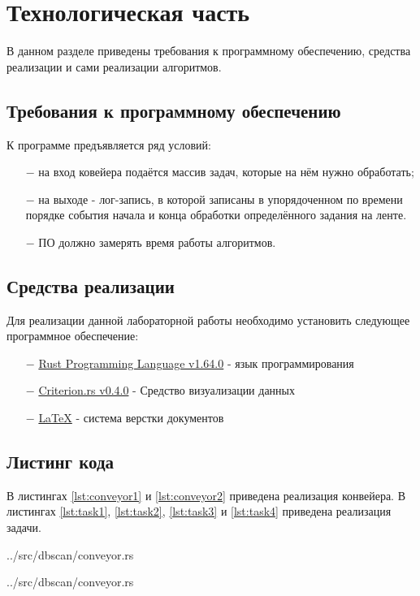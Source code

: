 \chapter{Технологическая часть}

В данном разделе приведены требования к программному обеспечению, средства реализации и сами реализации алгоритмов.

\section{Требования к программному обеспечению}
К программе предъявляется ряд условий:
\begin{itemize}
    \item[$-$] на вход ковейера подаётся массив задач, которые на нём нужно обработать;
	\item[$-$] на выходе - лог-запись, в которой записаны в упорядоченном по времени порядке события начала и конца обработки определённого задания на ленте.
    \item[$-$] ПО должно замерять время работы алгоритмов.
\end{itemize}

\section{Средства реализации}
Для реализации данной лабораторной работы необходимо установить следующее программное обеспечение:
\begin{itemize}
    \item[$-$] \href{https://www.rust-lang.org/}{Rust Programming Language v1.64.0} - язык программирования\cite{Rust}
    \item[$-$] \href{https://github.com/bheisler/criterion.rs}{Criterion.rs v0.4.0} - Средство визуализации данных
    \item[$-$] \href{https://www.latex-project.org/}{LaTeX} - система верстки документов
\end{itemize}

\section{Листинг кода}

В листингах \ref{lst:conveyor1} и \ref{lst:conveyor2} приведена реализация конвейера. В листингах \ref{lst:task1}, \ref{lst:task2}, \ref{lst:task3} и \ref{lst:task4} приведена реализация задачи.

\begin{lstinputlisting}[
	caption={Реализация конвейера, часть 1},
	label={lst:conveyor1},
	style={rust},
	linerange={1-39}
]{../src/dbscan/conveyor.rs}
\end{lstinputlisting}
\clearpage
\begin{lstinputlisting}[
	caption={Реализация конвейера, часть 2},
	label={lst:conveyor2},
	style={rust},
	linerange={41-55}
]{../src/dbscan/conveyor.rs}
\end{lstinputlisting}

